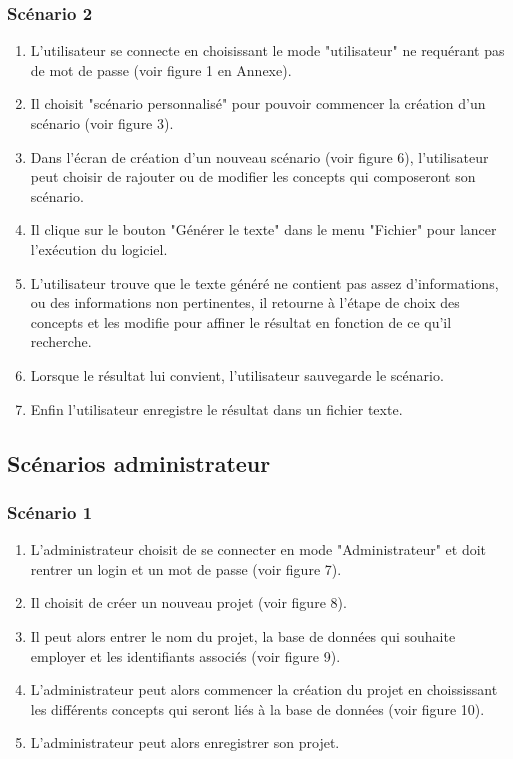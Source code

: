 \documentclass[12pt]{report}
\begin{document}
\subsubsection{Scénario 2}
    \begin{enumerate}
    		\item L'utilisateur se connecte en choisissant le mode "utilisateur" ne requérant pas de mot de passe (voir figure 1 en Annexe).
           \item Il choisit "scénario personnalisé" pour pouvoir commencer la création d'un scénario (voir figure 3).
           	\item Dans l'écran  de création d'un nouveau scénario (voir figure 6), l'utilisateur peut choisir de rajouter ou de modifier les concepts qui composeront son scénario.
            \item Il clique sur le bouton "Générer le texte" dans le menu "Fichier" pour lancer l'exécution du logiciel.
            \item L'utilisateur trouve que le texte généré ne contient pas assez d'informations, ou des informations non pertinentes, il retourne à l'étape de choix des concepts et les modifie pour affiner le résultat en fonction de ce qu'il recherche.
            \item Lorsque le résultat lui convient, l'utilisateur sauvegarde le scénario.
            \item Enfin l'utilisateur enregistre le résultat dans un fichier texte.
            \end{enumerate}


\subsection{Scénarios administrateur}

\subsubsection{Scénario 1}
    \begin{enumerate}
    \item L'administrateur choisit de se connecter en mode "Administrateur" et doit rentrer un login et un mot de passe (voir figure 7).
            \item Il choisit de créer un nouveau projet (voir figure 8).
            \item Il peut alors entrer le nom du projet, la base de données qui souhaite employer et les identifiants associés (voir figure 9).
            \item L'administrateur peut alors commencer la création du projet en choississant les différents concepts qui seront liés à la base de données (voir figure 10).
            \item L'administrateur peut alors enregistrer son projet.
            \end{enumerate}
\end{document}
